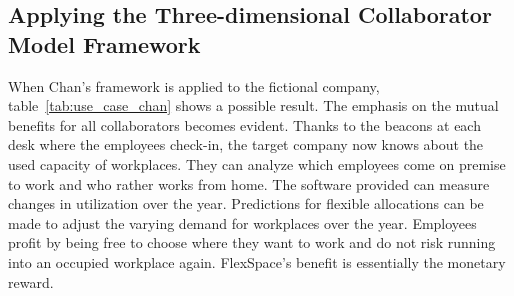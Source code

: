 	\subsection{Applying the Three-dimensional Collaborator Model Framework}
	\vspace{-1em}
			When  Chan's framework is applied to the fictional company, table~\ref{tab:use_case_chan} shows a possible result. The emphasis on the mutual benefits for all collaborators becomes evident. Thanks to the beacons at each desk where the employees check-in, the target company now knows about the used capacity of workplaces. They can analyze which employees come on premise to work and who rather works from home. The software provided can measure changes in utilization over the year. Predictions for flexible allocations can be made to adjust the varying demand for workplaces over the year. Employees profit by being free to choose where they want to work and do not risk running into an occupied workplace again. FlexSpace's benefit is essentially the monetary reward.
